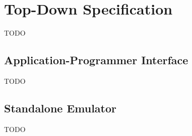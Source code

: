\section{Top-Down Specification}

TODO

\subsection{Application-Programmer Interface}

TODO

\subsection{Standalone Emulator}

TODO
